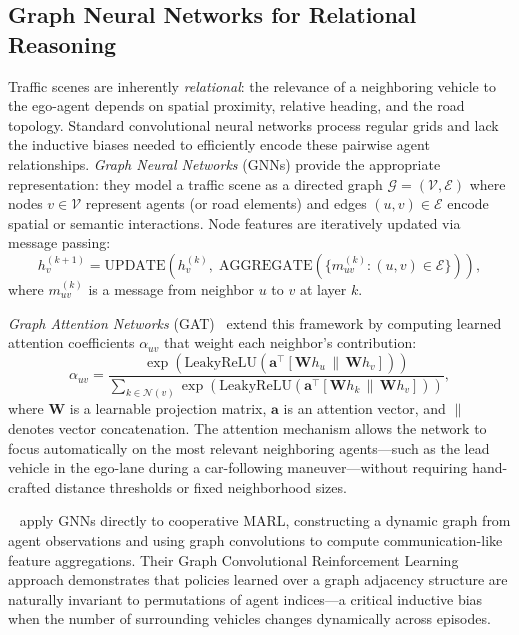 \documentclass[12pt, a4paper]{article}
\begin{document}
\subsection{Graph Neural Networks for Relational Reasoning}
\label{sec:gnns}

Traffic scenes are inherently \emph{relational}: the relevance of a
neighboring vehicle to the ego-agent depends on spatial proximity, relative
heading, and the road topology.  Standard convolutional neural networks
process regular grids and lack the inductive biases needed to efficiently
encode these pairwise agent relationships.  \emph{Graph Neural Networks}
(GNNs) provide the appropriate representation: they model a traffic scene as
a directed graph $\mathcal{G} = (\mathcal{V}, \mathcal{E})$ where nodes
$v \in \mathcal{V}$ represent agents (or road elements) and edges
$(u, v) \in \mathcal{E}$ encode spatial or semantic interactions.
Node features are iteratively updated via message passing:
\[
  h_v^{(k+1)} = \mathrm{UPDATE}\!\left(h_v^{(k)},\;
    \mathrm{AGGREGATE}\!\left(\{m_{uv}^{(k)} : (u,v) \in \mathcal{E}\}\right)\right),
\]
where $m_{uv}^{(k)}$ is a message from neighbor $u$ to $v$ at layer $k$.

\emph{Graph Attention Networks} (GAT)~\cite{velickovic2018graph} extend this
framework by computing learned attention coefficients $\alpha_{uv}$ that
weight each neighbor's contribution:
\[
  \alpha_{uv} = \frac{
    \exp\!\left(\mathrm{LeakyReLU}(\mathbf{a}^\top
      [\mathbf{W} h_u \,\|\, \mathbf{W} h_v])\right)
  }{
    \sum_{k \in \mathcal{N}(v)} \exp\!\left(\mathrm{LeakyReLU}(\mathbf{a}^\top
      [\mathbf{W} h_k \,\|\, \mathbf{W} h_v])\right)
  },
\]
where $\mathbf{W}$ is a learnable projection matrix, $\mathbf{a}$ is an
attention vector, and $\|$ denotes vector concatenation.  The attention
mechanism allows the network to focus automatically on the most relevant
neighboring agents---such as the lead vehicle in the ego-lane during a
car-following maneuver---without requiring hand-crafted distance thresholds
or fixed neighborhood sizes.

\citeauthor{jiang2019graph}~\cite{jiang2019graph} apply GNNs directly to
cooperative MARL, constructing a dynamic graph from agent observations and
using graph convolutions to compute communication-like feature aggregations.
Their Graph Convolutional Reinforcement Learning approach demonstrates that
policies learned over a graph adjacency structure are naturally invariant to
permutations of agent indices---a critical inductive bias when the number of
surrounding vehicles changes dynamically across episodes.
\end{document}
